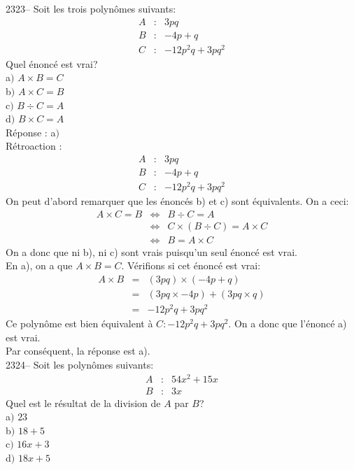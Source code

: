 \documentclass[letterpaper, 12pt]{article}
\begin{document}
2323-- Soit les trois polyn\^omes suivants:
\begin{eqnarray*}
 A&:&3pq\\
B&:&-4p+q\\
C&:&-12p^{2}q+3pq^{2}
\end{eqnarray*}
Quel \'enonc\'e est vrai?\\

a$)$ $A\times B=C$\\
b$)$ $A\times C=B$\\
c$)$ $B\div C=A$\\
d$)$ $B\times C=A$\\

R\'eponse : a$)$\\

R\'etroaction :
\begin{eqnarray*}
 A&:&3pq\\
B&:&-4p+q\\
C&:&-12p^{2}q+3pq^{2}
\end{eqnarray*}
On peut d'abord remarquer que les \'enonc\'es b) et c) sont \'equivalents. On a ceci:
\begin{eqnarray*}
 A\times C=B &\Longleftrightarrow& B\div C=A\\
 &\Longleftrightarrow& C\times \left( B\div C\right) =A\times C\\
 &\Longleftrightarrow& B=A\times C
\end{eqnarray*}
On a donc que ni b), ni c) sont vrais puisqu'un seul \'enonc\'e est vrai.\\
En a), on a que $A\times B=C$. V\'erifions si cet \'enonc\'e est vrai:
\begin{eqnarray*}
 A\times B&=&(3pq)\times(-4p+q)\\
&=&(3pq\times-4p)+(3pq\times q)\\
&=&-12p^{2}q+3pq^{2}
\end{eqnarray*}
Ce polyn\^ome est bien \'equivalent \`a $C:-12p^{2}q+3pq^{2}$. On a donc que l'\'enonc\'e a) est vrai.\\
Par cons\'equent, la r\'eponse est a).\\

2324-- Soit les polyn\^omes suivants:
\begin{eqnarray*}
 A&:&54x^{2}+15x\\
B&:&3x
\end{eqnarray*}
Quel est le r\'esultat de la division de $A$ par $B$?\\

a$)$ $23$\\
b$)$ $18+5$\\
c$)$ $16x+3$\\
d$)$ $18x+5$\\
\end{document}
